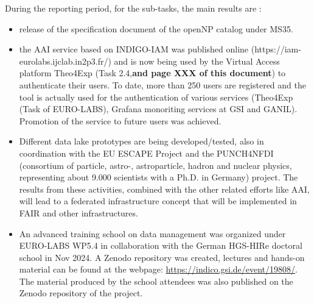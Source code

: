 During the reporting period, for the sub-tasks, the main results are :
\begin{itemize}
    \item  release of the specification document of the openNP catalog under MS35.
    \item the AAI service based on INDIGO-IAM was published online (https://iam-eurolabs.ijclab.in2p3.fr/) and is now being used by the Virtual Access platform Theo4Exp (Task 2.4,\textbf{and page XXX of this document}) to authenticate their users. To date, more than 250 users are registered and the tool is actually used for the authentication of various services (Theo4Exp (Task of EURO-LABS), Grafana monoriting services at GSI and GANIL). Promotion of the service to future users was achieved.
    \item Different data lake prototypes are being developed/tested, also in coordination with the EU ESCAPE Project and the PUNCH4NFDI (consortium of particle, astro-, astroparticle, hadron and nuclear physics, representing about 9.000 scientists with a Ph.D. in Germany) project. The results from these activities, combined with the other related efforts like AAI, will lead to a federated infrastructure concept that will be implemented in FAIR and other infrastructures.
    \item An advanced training school on data management was organized under EURO-LABS WP5.4 in collaboration with the German  HGS-HIRe doctoral school in Nov 2024.  A Zenodo repository was created, lectures and hands-on material can be found at the webpage: \url{https://indico.gsi.de/event/19808/}. The material produced by the school attendees was also published on the Zenodo repository of the project.
\end{itemize}

